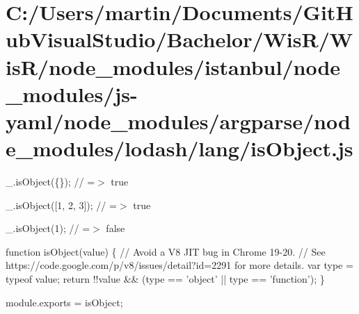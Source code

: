 \hypertarget{_c_1_2_users_2martin_2_documents_2_git_hub_visual_studio_2_bachelor_2_wis_r_2_wis_r_2node_moduleda776dea75911ea38abaea641f7b6bce}{}\section{C\+:/\+Users/martin/\+Documents/\+Git\+Hub\+Visual\+Studio/\+Bachelor/\+Wis\+R/\+Wis\+R/node\+\_\+modules/istanbul/node\+\_\+modules/js-\/yaml/node\+\_\+modules/argparse/node\+\_\+modules/lodash/lang/is\+Object.\+js}
\+\_\+.\+is\+Object(\{\}); // =$>$ true

\+\_\+.\+is\+Object(\mbox{[}1, 2, 3\mbox{]}); // =$>$ true

\+\_\+.\+is\+Object(1); // =$>$ false


\begin{DoxyCodeInclude}

\textcolor{keyword}{function} isObject(value) \{
  \textcolor{comment}{// Avoid a V8 JIT bug in Chrome 19-20.}
  \textcolor{comment}{// See https://code.google.com/p/v8/issues/detail?id=2291 for more details.}
  var type = typeof value;
  \textcolor{keywordflow}{return} !!value && (type == \textcolor{stringliteral}{'object'} || type == \textcolor{stringliteral}{'function'});
\}

module.exports = isObject;
\end{DoxyCodeInclude}
 
